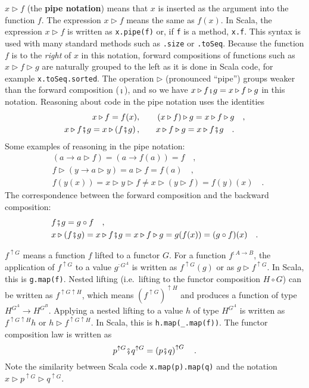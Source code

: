$x\triangleright f$ (the \textbf{pipe notation})
means that $x$ is inserted as the argument into the function $f$.
The expression $x\triangleright f$ means the same as $f(x)$. In
Scala, the expression $x\triangleright f$ is written as \lstinline!x.pipe(f)!
or, if \lstinline!f! is a method, \lstinline!x.f!. This syntax is
used with many standard methods such as \lstinline!.size! or \lstinline!.toSeq!.
Because the function $f$ is to the \emph{right} of $x$ in this notation,
forward compositions of functions such as $x\triangleright f\triangleright g$
are naturally grouped to the left as it is done in Scala code, for
example \lstinline!x.toSeq.sorted!. The operation $\triangleright$
(pronounced ``pipe'') groups weaker than the forward composition
($\bef$), and so we have $x\triangleright f\bef g=x\triangleright f\triangleright g$
in this notation. Reasoning about code in the pipe notation uses the
identities
\begin{align*}
x\triangleright f=f(x),\quad\quad & \left(x\triangleright f\right)\triangleright g=x\triangleright f\triangleright g\quad,\\
x\triangleright f\bef g=x\triangleright\left(f\bef g\right),\quad\quad & x\triangleright f\triangleright g=x\triangleright f\bef g\quad.
\end{align*}
Some examples of reasoning in the pipe notation:
\begin{align*}
 & \left(a\rightarrow a\triangleright f\right)=\left(a\rightarrow f(a)\right)=f\quad,\\
 & f\triangleright\left(y\rightarrow a\triangleright y\right)=a\triangleright f=f(a)\quad,\\
 & f(y(x))=x\triangleright y\triangleright f\neq x\triangleright\left(y\triangleright f\right)=f(y)(x)\quad.
\end{align*}
The correspondence between the forward composition and the backward
composition:
\begin{align*}
 & f\bef g=g\circ f\quad,\\
 & x\triangleright(f\bef g)=x\triangleright f\bef g=x\triangleright f\triangleright g=g(f(x))=(g\circ f)(x)\quad.
\end{align*}

$f^{\uparrow G}$ means a function $f$ lifted to a functor $G$.
For a function $f^{:A\rightarrow B}$, the application of $f^{\uparrow G}$
to a value $g^{:G^{A}}$ is written as $f^{\uparrow G}(g)$ or as
$g\triangleright f^{\uparrow G}$. In Scala, this is \lstinline!g.map(f)!.
Nested lifting (i.e.~lifting to the functor composition $H\circ G$)
can be written as $f^{\uparrow G\uparrow H}$, which means $\left(f^{\uparrow G}\right)^{\uparrow H}$
and produces a function of type $H^{G^{A}}\rightarrow H^{G^{B}}$.
Applying a nested lifting to a value $h$ of type $H^{G^{A}}$ is
written as $f^{\uparrow G\uparrow H}h$ or $h\triangleright f^{\uparrow G\uparrow H}$.
In Scala, this is \lstinline!h.map(_.map(f))!. The functor composition
law is written as
\[
p^{\uparrow G}\bef q^{\uparrow G}=\left(p\bef q\right)^{\uparrow G}\quad.
\]
Note the similarity between Scala code \lstinline!x.map(p).map(q)!
and the notation $x\triangleright p^{\uparrow G}\triangleright q^{\uparrow G}$.

